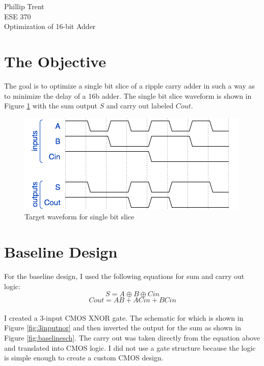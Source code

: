 \documentclass{article}
\newcommand*\xor{\mathbin{\oplus}}
\begin{document}
\noindent Phillip Trent
\\ESE 370
\\Optimization of 16-bit Adder
\\\section{The Objective}
The goal is to optimize a single bit slice of a ripple carry adder in such a way as to minimize the delay of a 16b adder. The single bit slice waveform is shown in Figure \ref{fig:waveform1} with the sum output $S$ and carry out labeled $Cout$.

\begin{figure}[H]
  \includegraphics[width=\linewidth]{baseline_screenshots/wavedrom.png}
  \caption{Target waveform for single bit slice}
  \label{fig:waveform1}
\end{figure}

\section{Baseline Design}
For the baseline design, I used the following equations for sum and carry out logic:
$$S = A \xor B \xor Cin$$
$$Cout = AB + ACin + BCin$$
\\I created a 3-input CMOS XNOR gate. The schematic for which is shown in Figure \ref{fig:3inputnor} and then inverted the output for the sum as shown in Figure \ref{fig:baselinesch}. The carry out was taken directly from the equation above and translated into CMOS logic. I did not use a gate structure because the logic is simple enough to create a custom CMOS design. \pagebreak
\end{document}
